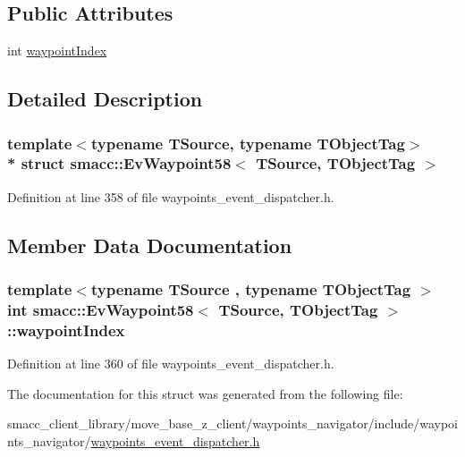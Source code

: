 \subsection*{Public Attributes}
\begin{DoxyCompactItemize}
\item 
int \hyperlink{structsmacc_1_1EvWaypoint58_a867b5a45f1d799acce0667e7516bfdab}{waypoint\+Index}
\end{DoxyCompactItemize}


\subsection{Detailed Description}
\subsubsection*{template$<$typename T\+Source, typename T\+Object\+Tag$>$\\*
struct smacc\+::\+Ev\+Waypoint58$<$ T\+Source, T\+Object\+Tag $>$}



Definition at line 358 of file waypoints\+\_\+event\+\_\+dispatcher.\+h.



\subsection{Member Data Documentation}
\subsubsection[{\texorpdfstring{waypoint\+Index}{waypointIndex}}]{\setlength{\rightskip}{0pt plus 5cm}template$<$typename T\+Source , typename T\+Object\+Tag $>$ int {\bf smacc\+::\+Ev\+Waypoint58}$<$ T\+Source, T\+Object\+Tag $>$\+::waypoint\+Index}\hypertarget{structsmacc_1_1EvWaypoint58_a867b5a45f1d799acce0667e7516bfdab}{}\label{structsmacc_1_1EvWaypoint58_a867b5a45f1d799acce0667e7516bfdab}


Definition at line 360 of file waypoints\+\_\+event\+\_\+dispatcher.\+h.



The documentation for this struct was generated from the following file\+:\begin{DoxyCompactItemize}
\item 
smacc\+\_\+client\+\_\+library/move\+\_\+base\+\_\+z\+\_\+client/waypoints\+\_\+navigator/include/waypoints\+\_\+navigator/\hyperlink{waypoints__event__dispatcher_8h}{waypoints\+\_\+event\+\_\+dispatcher.\+h}\end{DoxyCompactItemize}
